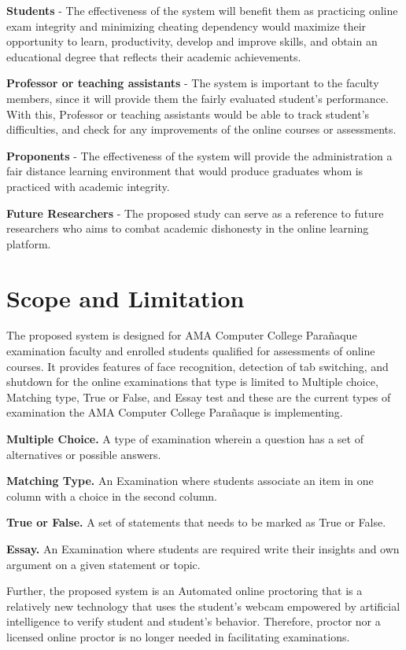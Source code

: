 \textbf{Students} - The effectiveness of the system will benefit them as practicing online exam integrity and minimizing cheating dependency would maximize their opportunity to learn, productivity, develop and improve skills, and obtain an educational degree that reflects their academic achievements.

\textbf{Professor or teaching assistants} - The system is important to the faculty members, since it will provide them the fairly evaluated student's performance.
With this, Professor or teaching assistants would be able to track student's difficulties, and check for any improvements of the online courses or assessments.

\textbf{Proponents} - The effectiveness of the system will provide the administration a fair distance learning environment that would produce graduates whom is practiced with academic integrity.

\textbf{Future Researchers} - The proposed study can serve as a reference to future researchers who aims to combat academic dishonesty in the online learning platform.

\section{Scope and Limitation}

The proposed system is designed for AMA Computer College Parañaque examination faculty and enrolled students qualified for assessments of online courses.
It provides features of face recognition, detection of tab switching, and shutdown for the online examinations that type is limited to Multiple choice, Matching type, True or False, and Essay test and these are the current types of examination the AMA Computer College Parañaque is implementing.

\textbf{Multiple Choice.}
A type of examination wherein a question has a set of alternatives or possible answers.

\textbf{Matching Type.}
An Examination where students associate an item in one column with a choice in the second column.

\textbf{True or False.}
A set of statements that needs to be marked as True or False.

\textbf{Essay.}
An Examination where students are required write their insights and own argument on a given statement or topic.

Further, the proposed system is an Automated online proctoring that is a relatively new technology that uses the student’s webcam empowered by artificial intelligence to verify student and student’s behavior.
Therefore, proctor nor a licensed online proctor is no longer needed in facilitating examinations.

